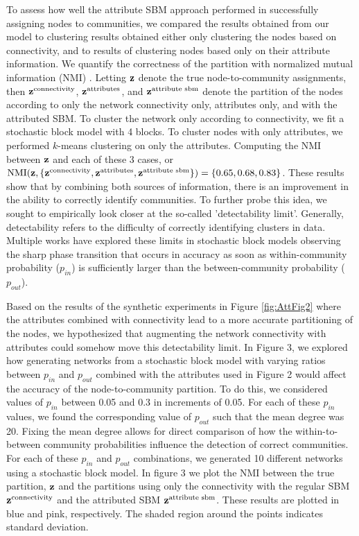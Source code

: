 To assess how well the attribute SBM approach performed in successfully assigning nodes to communities, we compared the results obtained from our model to clustering results obtained either only clustering the nodes based on connectivity, and to results of clustering nodes based only on their attribute information. We quantify the correctness of the partition with normalized mutual information (NMI) \cite{commdeccompare}. Letting ${\bf z}$ denote the true node-to-community assignments, then ${\bf z}^{\text{connectivity}}$, ${\bf z}^{\text{attributes}}$, and ${\bf z}^{\text{attribute sbm}}$ denote the partition of the nodes according to only the network connectivity only, attributes only, and with the attributed SBM. To cluster the network only according to connectivity, we fit a stochastic block model with 4 blocks. To cluster nodes with only attributes, we performed $k$-means clustering on only the attributes. Computing the NMI between ${\bf z}$ and each of these 3 cases, or $\text{NMI}({\bf z},\{{\bf z}^{\text{connectivity}}, {\bf z}^{\text{attributes}},{\bf z}^{\text{attribute sbm}}\})=\{0.65,0.68,0.83\}$. These results show that by combining both sources of information, there is an improvement in the ability to correctly identify communities. To further probe this idea, we sought to empirically look closer at the so-called 'detectability limit'. Generally, detectability refers to the difficulty of correctly identifying clusters in data. Multiple works \cite{decelle2011inference,taylor2015enhanced} have explored these limits in stochastic block models observing the sharp phase transition that occurs in accuracy as soon as within-community probability ($p_{in}$)  is sufficiently larger than the between-community probability ($p_{out}$). 

Based on the results of the synthetic experiments in Figure \ref{fig:AttFig2} where the attributes combined with connectivity lead to a more accurate partitioning of the nodes, we hypothesized that augmenting the network connectivity with attributes could somehow move this detectability limit. In Figure 3, we explored how generating networks from a stochastic block model with varying ratios between $p_{in}$ and $p_{out}$ combined with the attributes used in Figure 2 would affect the accuracy of the node-to-community partition. To do this, we considered values of $p_{in}$ between 0.05 and 0.3 in increments of 0.05. For each of these $p_{in}$ values, we found the corresponding value of $p_{out}$ such that the mean degree was 20. Fixing the mean degree allows for direct comparison of how the within-to-between community probabilities influence the detection of correct communities. For each of these $p_{in}$ and $p_{out}$ combinations, we generated 10 different networks using a stochastic block model. In figure 3 we plot the NMI between the true partition, ${\bf z}$ and the partitions using only the connectivity with the regular SBM ${\bf z}^{\text{connectivity}}$ and the attributed SBM ${\bf z}^{\text{attribute sbm}}$. These results are plotted in blue and pink, respectively. The shaded region around the points indicates standard deviation. 

